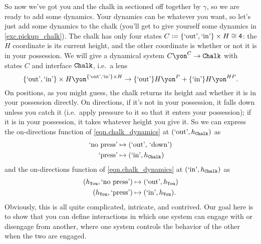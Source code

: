 \documentclass[Book-Poly]{subfiles}
\begin{document}
\begin{example}
So now we've got you and the chalk in sectioned off together by $\gamma$, so we are ready to add some dynamics.
Your dynamics can be whatever you want, so let's just add some dynamics to the chalk (you'll get to give yourself some dynamics in \cref{exc.pickup_chalk}).
The chalk has only four states $C\coloneqq \{\text{`out'}, \text{`in'}\} \times H \cong\textsf{4}$: the $H$ coordinate is its current height, and the other coordinate is whether or not it is in your possession.
We will give a dynamical system $C\yon^C\to\const{Chalk}$ with states $C$ and interface $\texttt{Chalk}$, i.e.\ a lens
\begin{equation}\label{eqn.chalk_dynamics}
	\{\text{`out'}, \text{`in'}\} \times H\yon^{\{\text{`out'}, \text{`in'}\} \times H}\to \{\text{`out'}\}H\yon^P + \{\text{`in'}\}H\yon^{HP}.
\end{equation}
On positions, as you might guess, the chalk returns its height and whether it is in your possession directly.
On directions, if it's not in your possession, it falls down unless you catch it (i.e.\ apply pressure to it so that it enters your possession); if it is in your possession, it takes whatever height you give it.
So we can express the on-directions function of \eqref{eqn.chalk_dynamics} at $(\text{`out'}, h_{\texttt{Chalk}})$ as
\begin{align*}
	\text{`no press'} &\mapsto (\text{`out', `down'}) \\
	\text{`press'} &\mapsto (\text{`in'}, h_{\texttt{Chalk}})
\end{align*}
and the on-directions function of \eqref{eqn.chalk_dynamics} at $(\text{`in'}, h_{\texttt{Chalk}})$ as
\begin{align*}
	(h_{\texttt{You}}, \text{`no press'}) &\mapsto (\text{`out'}, h_{\texttt{You}}) \\
	(h_{\texttt{You}}, \text{`press'}) &\mapsto (\text{`in'}, h_{\texttt{You}}).
\end{align*}
Obviously, this is all quite complicated, intricate, and contrived.
Our goal here is to show that you can define interactions in which one system can engage with or disengage from another, where one system controls the behavior of the other when the two are engaged.
\end{example}
\end{document}
